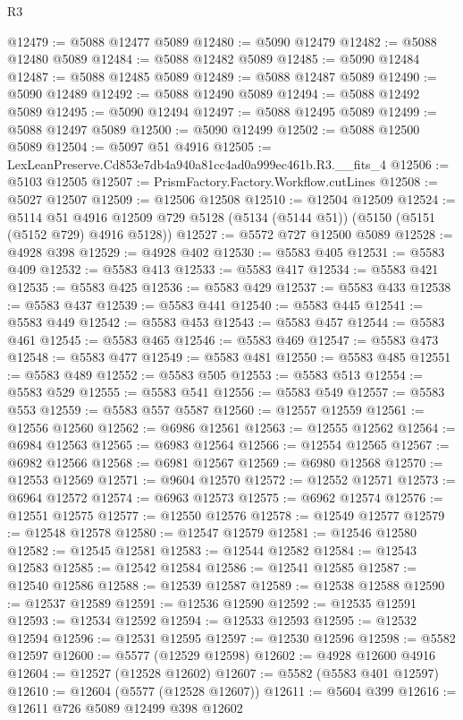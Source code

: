 \begin{lexlean}{R3}
\begin{coremodule}
@12479 := @5088 @12477 @5089
@12480 := @5090 @12479
@12482 := @5088 @12480 @5089
@12484 := @5088 @12482 @5089
@12485 := @5090 @12484
@12487 := @5088 @12485 @5089
@12489 := @5088 @12487 @5089
@12490 := @5090 @12489
@12492 := @5088 @12490 @5089
@12494 := @5088 @12492 @5089
@12495 := @5090 @12494
@12497 := @5088 @12495 @5089
@12499 := @5088 @12497 @5089
@12500 := @5090 @12499
@12502 := @5088 @12500 @5089
@12504 := @5097 @51 @4916
@12505 := LexLeanPreserve.Cd853e7db4a940a81cc4ad0a999ec461b.R3.__fits_4
@12506 := @5103 @12505
@12507 := PrismFactory.Factory.Workflow.cutLines
@12508 := @5027 @12507
@12509 := @12506 @12508
@12510 := @12504 @12509
@12524 := @5114
    @51
    @4916
    @12509
    @729
    @5128
    (@5134 (@5144 @51))
    (@5150 (@5151 (@5152 @729) @4916 @5128))
@12527 := @5572 @727 @12500 @5089
@12528 := @4928 @398
@12529 := @4928 @402
@12530 := @5583 @405
@12531 := @5583 @409
@12532 := @5583 @413
@12533 := @5583 @417
@12534 := @5583 @421
@12535 := @5583 @425
@12536 := @5583 @429
@12537 := @5583 @433
@12538 := @5583 @437
@12539 := @5583 @441
@12540 := @5583 @445
@12541 := @5583 @449
@12542 := @5583 @453
@12543 := @5583 @457
@12544 := @5583 @461
@12545 := @5583 @465
@12546 := @5583 @469
@12547 := @5583 @473
@12548 := @5583 @477
@12549 := @5583 @481
@12550 := @5583 @485
@12551 := @5583 @489
@12552 := @5583 @505
@12553 := @5583 @513
@12554 := @5583 @529
@12555 := @5583 @541
@12556 := @5583 @549
@12557 := @5583 @553
@12559 := @5583 @557 @5587
@12560 := @12557 @12559
@12561 := @12556 @12560
@12562 := @6986 @12561
@12563 := @12555 @12562
@12564 := @6984 @12563
@12565 := @6983 @12564
@12566 := @12554 @12565
@12567 := @6982 @12566
@12568 := @6981 @12567
@12569 := @6980 @12568
@12570 := @12553 @12569
@12571 := @9604 @12570
@12572 := @12552 @12571
@12573 := @6964 @12572
@12574 := @6963 @12573
@12575 := @6962 @12574
@12576 := @12551 @12575
@12577 := @12550 @12576
@12578 := @12549 @12577
@12579 := @12548 @12578
@12580 := @12547 @12579
@12581 := @12546 @12580
@12582 := @12545 @12581
@12583 := @12544 @12582
@12584 := @12543 @12583
@12585 := @12542 @12584
@12586 := @12541 @12585
@12587 := @12540 @12586
@12588 := @12539 @12587
@12589 := @12538 @12588
@12590 := @12537 @12589
@12591 := @12536 @12590
@12592 := @12535 @12591
@12593 := @12534 @12592
@12594 := @12533 @12593
@12595 := @12532 @12594
@12596 := @12531 @12595
@12597 := @12530 @12596
@12598 := @5582 @12597
@12600 := @5577 (@12529 @12598)
@12602 := @4928 @12600 @4916
@12604 := @12527 (@12528 @12602)
@12607 := @5582 (@5583 @401 @12597)
@12610 := @12604 (@5577 (@12528 @12607))
@12611 := @5604 @399
@12616 := @12611 @726 @5089 @12499 @398 @12602

\end{coremodule}
\end{lexlean}
